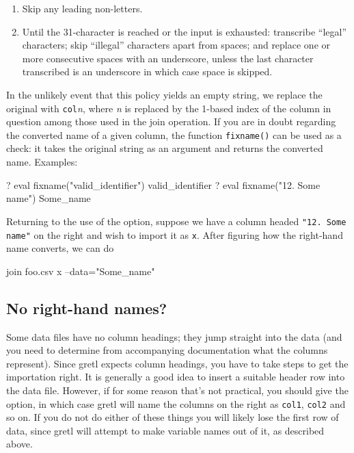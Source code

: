 \begin{enumerate}
\item Skip any leading non-letters.
\item Until the 31-character is reached or the input is exhausted:
  transcribe ``legal'' characters; skip ``illegal'' characters apart
  from spaces; and replace one or more consecutive spaces with an
  underscore, unless the last character transcribed is an underscore
  in which case space is skipped.
\end{enumerate}

In the unlikely event that this policy yields an empty string, we
replace the original with \texttt{col}\textsl{n}, where \textsl{n} is
replaced by the 1-based index of the column in question among those
used in the join operation. If you are in doubt regarding the
converted name of a given column, the function \texttt{fixname()} can
be used as a check: it takes the original string as an argument and
returns the converted name. Examples:

\begin{code}
? eval fixname("valid_identifier")
valid_identifier
? eval fixname("12. Some name")
Some_name
\end{code}

Returning to the use of the  option, suppose we have a
column headed \verb|"12. Some name"| on the right and wish to import
it as \texttt{x}. After figuring how the right-hand name converts, we
can do
%
\begin{code}
join foo.csv x --data="Some_name"
\end{code}

\subsection{No right-hand names?}
\label{subsec:no-rhnames}

Some data files have no column headings; they jump straight into the
data (and you need to determine from accompanying documentation what
the columns represent). Since gretl expects column headings, you have
to take steps to get the importation right. It is generally a good
idea to insert a suitable header row into the data file. However, if
for some reason that's not practical, you should give the
 option, in which case gretl will name the columns
on the right as \texttt{col1}, \texttt{col2} and so on. If you do not
do either of these things you will likely lose the first row of data,
since gretl will attempt to make variable names out of it, as
described above.

